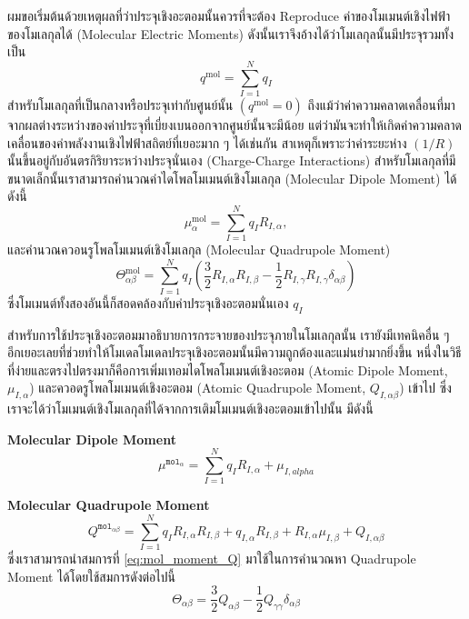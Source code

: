 ผมขอเริ่มต้นด้วยเหตุผลที่ว่าประจุเชิงอะตอมนั้นควรที่จะต้อง Reproduce ค่าของโมเมนต์เชิงไฟฟ้าของโมเลกุลได้ (Molecular Electric Moments) ดังนั้นเราจึงอ้างได้ว่าโมเลกุลนั้นมีประจุรวมทั้งเป็น
%
\begin{equation}
  q^{\mathrm{mol}}
  =
  \sum_{I=1}^N q_I
\end{equation}
%
สำหรับโมเลกุลที่เป็นกลางหรือประจุเท่ากับศูนย์นั้น $(q^{\mathrm{mol}} = 0)$ ถึงแม้ว่าค่าความคลาดเคลื่อนที่มาจากผลต่างระหว่างของค่าประจุที่เบี่ยงเบนออกจากศูนย์นั้นจะมีน้อย แต่ว่ามันจะทำให้เกิดค่าความคลาดเคลื่อนของค่าพลังงานเชิงไฟฟ้าสถิตย์ที่เยอะมาก ๆ ได้เช่นกัน สาเหตุก็เพราะว่าค่าระยะห่าง $(1 / R)$ นั้นขึ้นอยู่กับอันตรกิริยาระหว่างประจุนั่นเอง (Charge-Charge Interactions) สำหรับโมเลกุลที่มีขนาดเล็กนั้นเราสามารถคำนวณค่าไดโพลโมเมนต์เชิงโมเลกุล (Molecular Dipole Moment) ได้ดังนี้
%
\begin{equation}
  \mu_\alpha^{\mathrm{mol}}
  =
  \sum_{I=1}^N q_I R_{I, \alpha},
\end{equation}
%
และคำนวณควอนรูโพลโมเมนต์เชิงโมเลกุล (Molecular Quadrupole Moment)
%
\begin{equation}
  \Theta_{\alpha \beta}^{\mathrm{mol}}
  =
  \sum_{I=1}^N q_I
  \left(
  \frac{3}{2} R_{I, \alpha} R_{I, \beta}
  -\frac{1}{2} R_{I, \gamma} R_{I, \gamma} \delta_{\alpha \beta}
  \right)
\end{equation}
%
ซึ่งโมเมนต์ทั้งสองอันนี้ก็สอดคล้องกับค่าประจุเชิงอะตอมนั่นเอง $q_I$

สำหรับการใช้ประจุเชิงอะตอมมาอธิบายการกระจายของประจุภายในโมเลกุลนั้น เรายังมีเทคนิคอื่น ๆ อีกเยอะเลยที่ช่วยทำให้โมเดลโมเดลประจุเชิงอะตอมนั้นมีความถูกต้องและแม่นยำมากยิ่งขึ้น หนึ่งในวิธีที่ง่ายและตรงไปตรงมาก็คือการเพิ่มเทอมไดโพลโมเมนต์เชิงอะตอม (Atomic Dipole Moment, $\mu_{I,\alpha}$) และควอดรูโพลโมเมนต์เชิงอะตอม (Atomic Quadrupole Moment, $Q_{I,\alpha \beta}$) เข้าไป ซึ่งเราจะได้ว่าโมเมนต์เชิงโมเลกุลที่ได้จากการเติมโมเมนต์เชิงอะตอมเข้าไปนั้น มีดังนี้

\noindent \textbf{Molecular Dipole Moment}
%
\begin{equation}
  \label{eq:mol_moment_mu}
  \mu^{\texttt{mol}_{\alpha}}
  =
  \sum^{N}_{I=1} q_{I} R_{I,\alpha} + \mu_{I,alpha}
\end{equation}

\noindent \textbf{Molecular Quadrupole Moment}
%
\begin{equation}
  \label{eq:mol_moment_Q}
  Q^{\texttt{mol}_{\alpha \beta}}
  =
  \sum^{N}_{I=1} q_{I} R_{I,\alpha} R_{I,\beta}
  + q_{I,\alpha} R_{I,\beta}
  + R_{I,\alpha} \mu_{I,\beta}
  + Q_{I,\alpha \beta}
\end{equation}
%
ซึ่งเราสามารถนำสมการที่ \eqref{eq:mol_moment_Q} มาใช้ในการคำนวณหา Quadrupole Moment ได้โดยใช้สมการดังต่อไปนี้
%
\begin{equation}
  \Theta_{\alpha \beta}
  =
  \frac{3}{2} Q_{\alpha \beta} - \frac{1}{2} Q_{\gamma \gamma} \delta_{\alpha \beta}
\end{equation}

